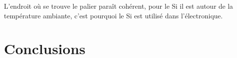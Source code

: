 L'endroit où se trouve le palier paraît cohérent, pour le Si il est autour de la température ambiante, c'est pourquoi le Si est utilisé dans l'électronique.




\section*{Conclusions}

